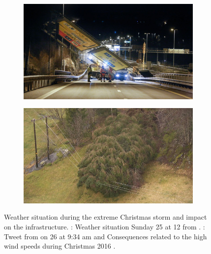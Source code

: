 \begin{figure}[t!]
\begin{subfigure}[b]{0.49\textwidth}
		\includegraphics[width=\textwidth]{./fig_introduction/street_sign_2512.jpg}
		\caption{}\label{fig:street_sign}
	\end{subfigure}
\hfill
	\begin{subfigure}[b]{0.49\textwidth}
		\includegraphics[width=\textwidth]{./fig_introduction/tree_nrk_2812.jpg}
		\caption{}\label{fig:tree_elec}
	\end{subfigure}
\caption{Weather situation during the extreme Christmas storm and impact on the infrastructure. \protect{}: Weather situation Sunday \SI{25}{\dec} at \SI{12}{\UTC} from 
\citep{olsen_ekstremvaerrapport._2017}.
	\protect{}: Tweet from \cite{meteorologene_her_2016} on \SI{26}{\dec} at 9:34 am
    \protect{} and \protect{} %
    Consequences related to the high wind speeds during Christmas 2016 \citep{ruud_tonn_2016,farestveit_80.000_2016}.
    } \label{fig:news}
\end{figure}